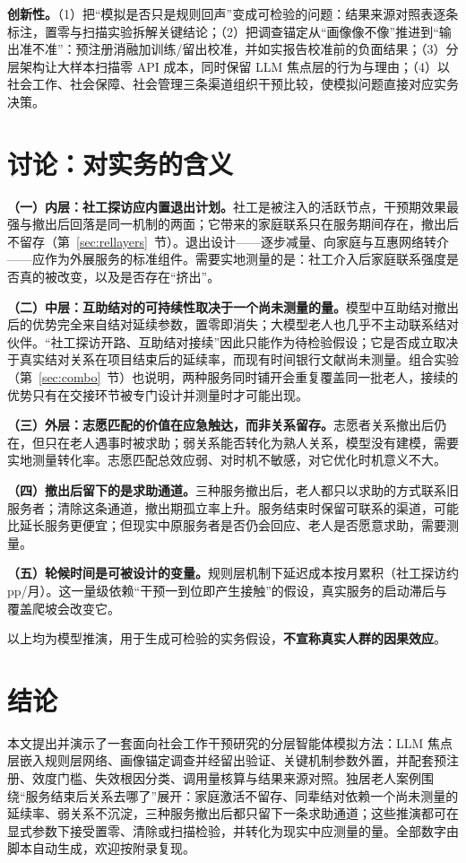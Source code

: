 \documentclass[10.5pt,twocolumn]{ctexart}
\begin{document}
\textbf{创新性。}（1）把``模拟是否只是规则回声''变成可检验的问题：结果来源对照表逐条标注，置零与扫描实验拆解关键结论；（2）把调查锚定从``画像像不像''推进到``输出准不准''：预注册消融加训练/留出校准，并如实报告校准前的负面结果；（3）分层架构让大样本扫描零 API 成本，同时保留 LLM 焦点层的行为与理由；（4）以社会工作、社会保障、社会管理三条渠道组织干预比较，使模拟问题直接对应实务决策。

\section{讨论：对实务的含义}\label{sec:discussion}
\textbf{（一）内层：社工探访应内置退出计划。}社工是被注入的活跃节点，干预期效果最强与撤出后回落是同一机制的两面；它带来的家庭联系只在服务期间存在，撤出后不留存（第~\ref{sec:rellayers}~节）。退出设计——逐步减量、向家庭与互惠网络转介——应作为外展服务的标准组件。需要实地测量的是：社工介入后家庭联系强度是否真的被改变，以及是否存在``挤出''。

\textbf{（二）中层：互助结对的可持续性取决于一个尚未测量的量。}模型中互助结对撤出后的优势完全来自结对延续参数，置零即消失；大模型老人也几乎不主动联系结对伙伴。``社工探访开路、互助结对接续''因此只能作为待检验假设；它是否成立取决于真实结对关系在项目结束后的延续率，而现有时间银行文献尚未测量\citep{lu2024timebank}。组合实验（第~\ref{sec:combo}~节）也说明，两种服务同时铺开会重复覆盖同一批老人，接续的优势只有在交接环节被专门设计并测量时才可能出现。

\textbf{（三）外层：志愿匹配的价值在应急触达，而非关系留存。}志愿者关系撤出后仍在，但只在老人遇事时被求助；弱关系能否转化为熟人关系，模型没有建模，需要实地测量转化率。志愿匹配总效应弱、对时机不敏感，对它优化时机意义不大。

\textbf{（四）撤出后留下的是求助通道。}三种服务撤出后，老人都只以求助的方式联系旧服务者；清除这条通道，撤出期孤立率上升。服务结束时保留可联系的渠道，可能比延长服务更便宜；但现实中原服务者是否仍会回应、老人是否愿意求助，需要测量。

\textbf{（五）轮候时间是可被设计的变量。}规则层机制下延迟成本按月累积（社工探访约 \DelayCostCasework pp/月）。这一量级依赖``干预一到位即产生接触''的假设，真实服务的启动滞后与覆盖爬坡会改变它。

以上均为模型推演，用于生成可检验的实务假设，\textbf{不宣称真实人群的因果效应}。

\section{结论}
本文提出并演示了一套面向社会工作干预研究的分层智能体模拟方法：LLM 焦点层嵌入规则层网络、画像锚定调查并经留出验证、关键机制参数外置，并配套预注册、效度门槛、失效根因分类、调用量核算与结果来源对照。独居老人案例围绕``服务结束后关系去哪了''展开：家庭激活不留存、同辈结对依赖一个尚未测量的延续率、弱关系不沉淀，三种服务撤出后都只留下一条求助通道；这些推演都可在显式参数下接受置零、清除或扫描检验，并转化为现实中应测量的量。全部数字由脚本自动生成，欢迎按附录复现。
\end{document}
